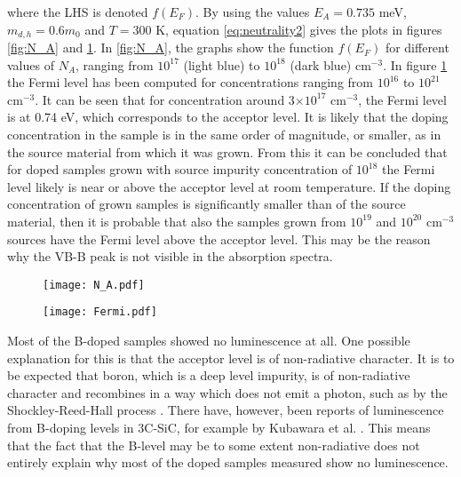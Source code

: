 where the LHS is denoted $f(E_F)$. By using the values $E_A = 0.735$ meV, $m_{d,h} = 0.6m_0$ and $T = 300$ K, equation \ref{eq:neutrality2} gives the plots in figures \ref{fig:N_A} and \ref{fig:fermi}. In \ref{fig:N_A}, the graphs show the function $f(E_F)$ for different values of $N_A$, ranging from $10^{17}$ (light blue) to $10^{18}$ (dark blue) cm$^{-3}$. In figure \ref{fig:fermi} the Fermi level has been computed for concentrations ranging from $10^{16}$ to $10^{21}$ cm$^{-3}$. It can be seen that for concentration around 3$\times10^{17}$ cm$^{-3}$, the Fermi level is at 0.74 eV, which corresponds to the acceptor level. It is likely that the doping concentration in the sample is in the same order of magnitude, or smaller, as in the source material from which it was grown. From this it can be concluded that for doped samples grown with source impurity concentration of $10^{18}$ the Fermi level likely is near or above the acceptor level at room temperature. If the doping concentration of grown samples is significantly smaller than of the source material, then it is probable that also the samples grown from $10^{19}$ and $10^{20}$ cm$^{-3}$ sources have the Fermi level above the acceptor level. This may be the reason why the VB-B peak is not visible in the absorption spectra. 

\begin{figure}[h]
\centering
\begin{minipage}{.5\textwidth}
  \centering
  \texttt{[image: N\_A.pdf]}
  \label{fig:N_A}
\end{minipage}%
\begin{minipage}{.5\textwidth}
  \centering
  \texttt{[image: Fermi.pdf]}
  \label{fig:fermi}
\end{minipage}
\end{figure}

Most of the B-doped samples showed no luminescence at all. One possible explanation for this is that the acceptor level is of non-radiative character. It is to be expected that boron, which is a deep level impurity, is of non-radiative character and recombines in a way which does not emit a photon, such as by the Shockley-Reed-Hall process \cite{Hall1952,Shockley1952}. There have, however, been reports of luminescence from B-doping levels in 3C-SiC, for example by Kubawara  et al. \cite{Company1976}. This means that the fact that the B-level may be to some extent non-radiative does not entirely explain why most of the doped samples measured show no luminescence. 

